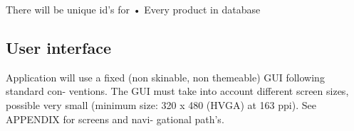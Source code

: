 \documentclass{report}
\begin{document}
There will be unique id's for
• Every product in database

\subsection{User interface}
Application will use a fixed (non skinable, non themeable) GUI following standard con- ventions. The GUI must take into account different screen sizes, possible very small (minimum size: 320 x 480 (HVGA) at 163 ppi). See APPENDIX for screens and navi- gational path's.





\appendix
\end{document}

